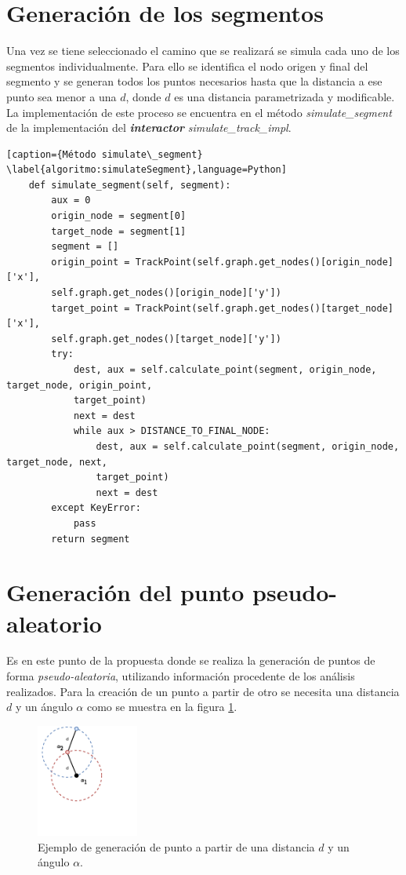 \section{Generación de los segmentos}
Una vez se tiene seleccionado el camino que se realizará se simula cada uno de los 
segmentos individualmente. Para ello se identifica el nodo origen y final del segmento y 
se generan todos los puntos necesarios hasta que la distancia a ese punto sea menor a 
una $d$, donde $d$ es una distancia parametrizada y modificable. La implementación 
de este proceso se encuentra en el método \textit{simulate\_segment} de la 
implementación del \textbf{\textit{interactor}} \textit{simulate\_track\_impl}.

\begin{lstlisting}[caption={Método simulate\_segment}
\label{algoritmo:simulateSegment},language=Python] 
    def simulate_segment(self, segment):
        aux = 0
        origin_node = segment[0]
        target_node = segment[1]
        segment = []
        origin_point = TrackPoint(self.graph.get_nodes()[origin_node]['x'], 	
        self.graph.get_nodes()[origin_node]['y'])
        target_point = TrackPoint(self.graph.get_nodes()[target_node]['x'], 
        self.graph.get_nodes()[target_node]['y'])
        try:
            dest, aux = self.calculate_point(segment, origin_node, target_node, origin_point, 
            target_point)
            next = dest
            while aux > DISTANCE_TO_FINAL_NODE:
                dest, aux = self.calculate_point(segment, origin_node, target_node, next, 
                target_point)
                next = dest
        except KeyError:
            pass
        return segment
\end{lstlisting}

\newpage
\section{Generación del punto pseudo-aleatorio}
Es en este punto de la propuesta donde se realiza la generación de puntos de forma 
\textit{pseudo-aleatoria}, utilizando información procedente de los análisis realizados. 
Para la creación de un punto a partir de otro se necesita una distancia $d$ y un ángulo 
$\alpha$ como se muestra en la figura \ref{figure:PointGeneration01}.
\begin{figure}[!htb]
\begin{center}
\includegraphics[scale=0.75, width=0.3\textwidth]{./Imagenes/PointGeneration01}
\caption{Ejemplo de generación de punto a partir de una distancia $d$ y un ángulo $
\alpha$.}
\label{figure:PointGeneration01}
\end{center}
\end{figure}

